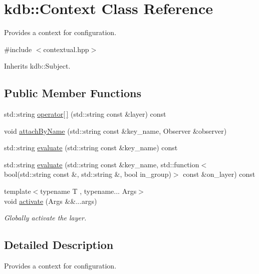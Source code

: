 \hypertarget{classkdb_1_1Context}{\section{kdb\-:\-:Context Class Reference}
\label{classkdb_1_1Context}
}


Provides a context for configuration.  




{\ttfamily \#include $<$contextual.\-hpp$>$}



Inherits kdb\-::\-Subject.

\subsection*{Public Member Functions}
\begin{DoxyCompactItemize}
\item 
std\-::string \hyperlink{classkdb_1_1Context_a331463d2eec8d2a5fdb8ffe4bfc181f6}{operator\mbox{[}$\,$\mbox{]}} (std\-::string const \&layer) const 
\item 
void \hyperlink{classkdb_1_1Context_aa9ecaf4d6c47dee9ec20d490d09484db}{attach\-By\-Name} (std\-::string const \&key\-\_\-name, Observer \&observer)
\item 
std\-::string \hyperlink{classkdb_1_1Context_a130675fbe20f1b20eaa462ec6a9fe98e}{evaluate} (std\-::string const \&key\-\_\-name) const 
\item 
std\-::string \hyperlink{classkdb_1_1Context_a0687e0df9fbb3e2670fb45f1f9afdfc9}{evaluate} (std\-::string const \&key\-\_\-name, std\-::function$<$ bool(std\-::string const \&, std\-::string \&, bool in\-\_\-group)$>$ const \&on\-\_\-layer) const 
\item 
{\footnotesize template$<$typename T , typename... Args$>$ }\\void \hyperlink{classkdb_1_1Context_a592a5e238bfa36820c561d9dfc0bb8ee}{activate} (Args \&\&...args)
\begin{DoxyCompactList}\small\item\em Globally activate the layer. \end{DoxyCompactList}\end{DoxyCompactItemize}


\subsection{Detailed Description}
Provides a context for configuration. 

